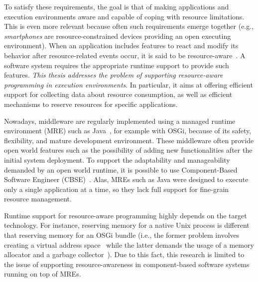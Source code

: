 To satisfy these requirements, the goal is that of making applications and execution environments aware and capable of coping with resource limitations.
This is even more relevant because often such requirements emerge together
(e.g., \textit{smartphones} are resource-constrained devices providing an open executing environment).
When an application includes features to react and modify its behavior after resource-related events occur, it is said to be resource-aware~\cite{Boldrini:2008:CRA:1549824.1550106,Peddemors:2007:NRA:1256316.1256338,Alhaisoni:2010:RTO:1664767.1664770,Polo:2011:RAS:2414338.2414352,Bulej:2012:PAC:2408860.2410068,autili2012hybrid}.
A software system requires the appropriate runtime support to provide such features.   
\textit{This thesis addresses the problem of supporting resource-aware programming in execution environments}.
In particular, it aims at offering efficient support for collecting data about resource consumption, as well as efficient mechanisms to reserve resources for specific applications.

Nowadays, middleware are regularly implemented using a managed runtime environment (MRE) such as Java~\cite{Bruneton:2006:FCM:1152333.1152345,Fouquet:2014:DED:2602576.2611461,OracleEJB3.0,Becker:2010:PCM:1712605.1712651,Carlson2006127}, for example with OSGi, because of its safety, flexibility, and mature  development environment.
These middleware often provide open world features such as the possibility of adding new functionalities after the initial system deployment.
To support the adaptability and manageability demanded by an open world runtime, it is possible to use  Component-Based Software Engineer (CBSE)~\cite{gruntz2002component,Duclos:2002:DUN:508386.508394, Bruneton:2006:FCM:1152333.1152345}.
Alas, MREs such as Java were designed to execute only a single application at a time, so they lack full support for fine-grain resource management.

Runtime support for resource-aware programming highly depends on the target technology.
For instance, reserving memory for a native Unix process is different that reserving memory for an OSGi bundle (i.e., the former problem involves creating a virtual address space~\cite{Stallings2014} while the latter demands the usage of a memory allocator and a garbage collector~\cite{OSGiAlliance2014,alpern2000jalapeno,Richard2012,Geoffray:2010:VSM:1837854.1736006}).
Due to this fact, this research is limited to the issue of supporting resource-awareness in component-based software systems running on top of MREs.


